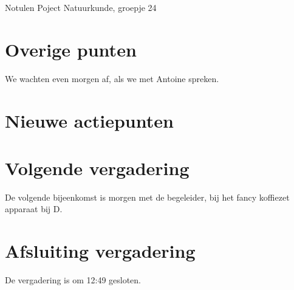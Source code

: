 \documentclass[11pt,a4paper]{article}
\begin{document}
\begin{Minutes}{Notulen Poject Natuurkunde, groepje 24}
\section{Overige punten}
We wachten even morgen af, als we met Antoine spreken.

\section{Nieuwe actiepunten}
\listoftasks
\section{Volgende vergadering}
De volgende bijeenkomst is morgen met de begeleider, bij het fancy koffiezet apparaat bij D.

\section{Afsluiting vergadering}
De vergadering is om 12:49 gesloten.


\end{Minutes}
\end{document}
